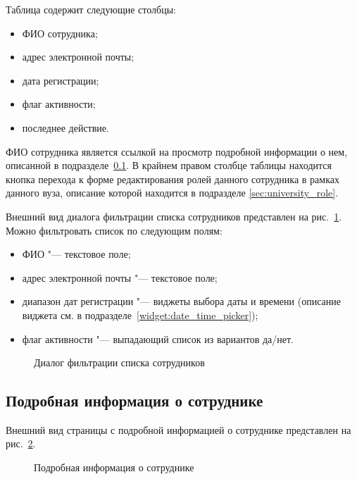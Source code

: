 Таблица содержит следующие столбцы:
\begin{itemize}
	\item ФИО сотрудника;
	\item адрес электронной почты;
	\item дата регистрации;
	\item флаг активности;
	\item последнее действие.
\end{itemize}

ФИО сотрудника является ссылкой на просмотр подробной информации о нем, описанной в подразделе~\ref{sec:employee_detail}.
В крайнем правом столбце таблицы находится кнопка перехода к форме редактирования ролей данного сотрудника в рамках 
данного вуза, описание которой находится в подразделе \ref{sec:university_role}.

Внешний вид диалога фильтрации списка сотрудников представлен на рис.~\ref{img:employee:employee_list_filter}.
Можно фильтровать список по следующим полям:

\begin{itemize}
	\item ФИО "--- текстовое поле;
	\item адрес электронной почты "--- текстовое поле;
	\item диапазон дат регистрации "--- виджеты выбора даты и времени 
	(описание виджета см. в подразделе~\ref{widget:date_time_picker});
	\item флаг активности "--- выпадающий список из вариантов да/нет.
\end{itemize}

\begin{figure}[H]
	\caption{Диалог фильтрации списка сотрудников}
	\label{img:employee:employee_list_filter}
\end{figure}


\subsection{Подробная информация о сотруднике} \label{sec:employee_detail}
Внешний вид страницы с подробной информацией о сотруднике представлен на рис.~\ref{img:employee:employee_detail}.
\begin{figure}[H]
	\caption{Подробная информация о сотруднике}
	\label{img:employee:employee_detail}
\end{figure}

